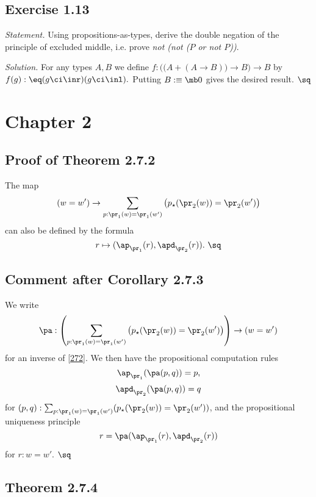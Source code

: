 \documentclass[12pt]{article}
\begin{document}

\subsection{Exercise 1.13}

\emph{Statement.} Using propositions-as-types, derive the double negation of the principle of excluded middle, i.e. prove \emph{not (not ($P$ or not $P$))}.

\nn\emph{Solution.} For any types $A,B$ we define $f:\Big(\big(A+(A\to B)\big)\to B\Big)\to B$ by $f(g):\eq(g\ci\inr)(g\ci\inl).$ Putting $B:\equiv\mb0$ gives the desired result. $\sq$


\section{Chapter 2}

\subsection{Proof of Theorem 2.7.2}

The map 
\begin{equation}\label{272}
(w=w')\to\sum_{p:\pr_1(w)=\pr_1(w')}\big(p_\star(\pr_2(w))=\pr_2(w')\big)
\end{equation}
can also be defined by the formula 
$$
r\mapsto(\ap_{\pr_1}(r),\apd_{\pr_2}(r)).\ \sq
$$ 


\subsection{Comment after Corollary 2.7.3}

We write 
\begin{equation}\label{273}
\pa:\left(\sum_{p:\pr_1(w)=\pr_1(w')}\big(p_\star(\pr_2(w))=\pr_2(w')\big)\right)\to(w=w')
\end{equation} 
for an inverse of \eqref{272}. We then have the propositional computation rules 
$$
\ap_{\pr_1}(\pa(p,q))=p,
$$
$$
\apd_{\pr_2}(\pa(p,q))=q
$$
for $(p,q):\sum_{p:\pr_1(w)=\pr_1(w')}(p_\star(\pr_2(w))=\pr_2(w'))$, and the propositional uniqueness principle 
$$
r=\pa(\ap_{\pr_1}(r),\apd_{\pr_2}(r))
$$ 
for $r:w=w'$. $\sq$


\subsection{Theorem 2.7.4}\label{274}
\end{document}
